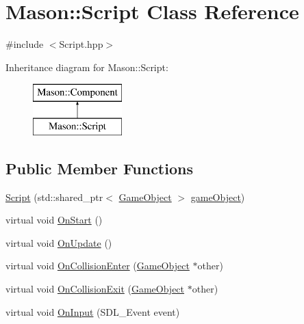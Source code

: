 \hypertarget{class_mason_1_1_script}{}\section{Mason\+:\+:Script Class Reference}
\label{class_mason_1_1_script}


{\ttfamily \#include $<$Script.\+hpp$>$}

Inheritance diagram for Mason\+:\+:Script\+:\begin{figure}[H]
\begin{center}
\leavevmode
\includegraphics[height=2.000000cm]{class_mason_1_1_script}
\end{center}
\end{figure}
\subsection*{Public Member Functions}
\begin{DoxyCompactItemize}
\item 
\hyperlink{class_mason_1_1_script_a3d41c440d07b53c15437a13754eff7d0}{Script} (std\+::shared\+\_\+ptr$<$ \hyperlink{class_mason_1_1_game_object}{Game\+Object} $>$ \hyperlink{class_mason_1_1_component_abaa67b569d0a70e26a4606f4a099a925}{game\+Object})
\item 
virtual void \hyperlink{class_mason_1_1_script_aa42915c752bb7f4623ca679b222edf2f}{On\+Start} ()
\item 
virtual void \hyperlink{class_mason_1_1_script_acafa4283460fb677484bb43ebec37743}{On\+Update} ()
\item 
virtual void \hyperlink{class_mason_1_1_script_a1088013d6edc47d74643aa48a7cbbbdf}{On\+Collision\+Enter} (\hyperlink{class_mason_1_1_game_object}{Game\+Object} $\ast$other)
\item 
virtual void \hyperlink{class_mason_1_1_script_a04d09648b7dba1bcb0a0ad3c3570e2f3}{On\+Collision\+Exit} (\hyperlink{class_mason_1_1_game_object}{Game\+Object} $\ast$other)
\item 
virtual void \hyperlink{class_mason_1_1_script_a84fff8072c4e8b56fb242b29f3491224}{On\+Input} (S\+D\+L\+\_\+\+Event event)
\end{DoxyCompactItemize}
